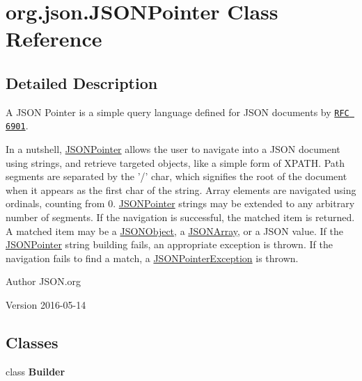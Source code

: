 \hypertarget{classorg_1_1json_1_1JSONPointer}{\section{org.\-json.\-J\-S\-O\-N\-Pointer Class Reference}
\label{classorg_1_1json_1_1JSONPointer}
}


\subsection{Detailed Description}
A J\-S\-O\-N Pointer is a simple query language defined for J\-S\-O\-N documents by \href{https://tools.ietf.org/html/rfc6901}{\tt R\-F\-C 6901}.

In a nutshell, \hyperlink{classorg_1_1json_1_1JSONPointer}{J\-S\-O\-N\-Pointer} allows the user to navigate into a J\-S\-O\-N document using strings, and retrieve targeted objects, like a simple form of X\-P\-A\-T\-H. Path segments are separated by the '/' char, which signifies the root of the document when it appears as the first char of the string. Array elements are navigated using ordinals, counting from 0. \hyperlink{classorg_1_1json_1_1JSONPointer}{J\-S\-O\-N\-Pointer} strings may be extended to any arbitrary number of segments. If the navigation is successful, the matched item is returned. A matched item may be a \hyperlink{classorg_1_1json_1_1JSONObject}{J\-S\-O\-N\-Object}, a \hyperlink{classorg_1_1json_1_1JSONArray}{J\-S\-O\-N\-Array}, or a J\-S\-O\-N value. If the \hyperlink{classorg_1_1json_1_1JSONPointer}{J\-S\-O\-N\-Pointer} string building fails, an appropriate exception is thrown. If the navigation fails to find a match, a \hyperlink{classorg_1_1json_1_1JSONPointerException}{J\-S\-O\-N\-Pointer\-Exception} is thrown.

\begin{DoxyAuthor}{Author}
J\-S\-O\-N.\-org 
\end{DoxyAuthor}
\begin{DoxyVersion}{Version}
2016-\/05-\/14 
\end{DoxyVersion}
\subsection*{Classes}
\begin{DoxyCompactItemize}
\item 
class {\bfseries Builder}
\end{DoxyCompactItemize}
